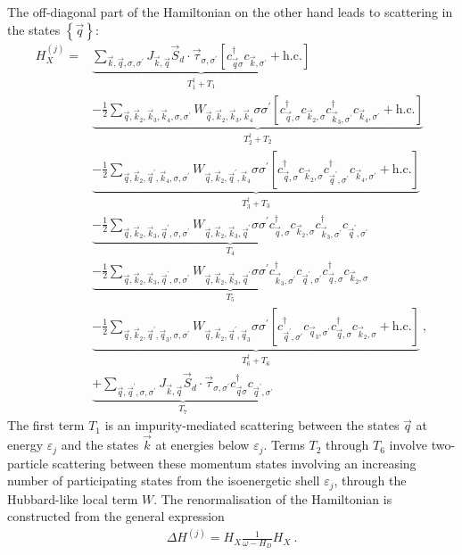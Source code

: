 \documentclass{revtex4-2}
\begin{document}
The off-diagonal part of the Hamiltonian on the other hand leads to scattering in the states \(\left\{ \vec q \right\} \):
\begin{equation}\begin{aligned}
	H_X^{(j)} =& \underbrace{\sum_{\vec k, \vec q, \sigma,\sigma^\prime}J_{\vec k, \vec q} \vec{S}_d\cdot\vec{\tau}_{\sigma,\sigma^\prime}\left[c^\dagger_{\vec q\sigma}c_{\vec k,\sigma^\prime} + \text{h.c.}\right]}_{T_1^\dagger + T_1} \\
		   &\underbrace{- \frac{1}{2}\sum_{\vec q,\vec k_2, \vec k_3, \vec k_4,\sigma,\sigma^\prime}W_{\vec q,\vec k_2,\vec k_3,\vec k_4} \sigma\sigma^\prime \left[c^\dagger_{\vec q,\sigma}c_{\vec k_2,\sigma}c^\dagger_{\vec k_3,\sigma^\prime}c_{\vec k_4,\sigma^\prime} + \text{h.c.}\right]}_{T_2^\dagger + T_2}\\
		   &\underbrace{- \frac{1}{2}\sum_{\vec q,\vec k_2, \vec q^\prime, \vec k_4,\sigma,\sigma^\prime}W_{\vec q,\vec k_2, \vec q^\prime, \vec k_4} \sigma\sigma^\prime \left[c^\dagger_{\vec q,\sigma}c_{\vec k_2,\sigma}c^\dagger_{\vec q^\prime,\sigma^\prime}c_{\vec k_4,\sigma^\prime} + \text{h.c.}\right]}_{T_3^\dagger + T_3}\\
		   &\underbrace{- \frac{1}{2}\sum_{\vec q,\vec k_2,\vec k_3,\vec q^\prime,\sigma,\sigma^\prime}W_{\vec q,\vec k_2,\vec k_3,\vec q^\prime} \sigma\sigma^\prime c^\dagger_{\vec q,\sigma}c_{\vec k_2,\sigma}c^\dagger_{\vec k_3,\sigma^\prime}c_{\vec q^\prime,\sigma^\prime}}_{T_4}\\
		   &\underbrace{- \frac{1}{2}\sum_{\vec q,\vec k_2,\vec k_3,\vec q^\prime,\sigma,\sigma^\prime}W_{\vec q,\vec k_2,\vec k_3,\vec q^\prime} \sigma\sigma^\prime c^\dagger_{\vec k_3,\sigma^\prime}c_{\vec q^\prime,\sigma^\prime}c^\dagger_{\vec q,\sigma}c_{\vec k_2,\sigma}}_{T_5}\\
		   &\underbrace{- \frac{1}{2}\sum_{\vec q,\vec k_2, \vec q^\prime, \vec q_3,\sigma,\sigma^\prime}W_{\vec q,\vec k_2, \vec q^\prime, \vec q_3} \sigma\sigma^\prime \left[c^\dagger_{\vec q^\prime,\sigma^\prime}c_{\vec q_3,\sigma^\prime}c^\dagger_{\vec q,\sigma}c_{\vec k_2,\sigma} + \text{h.c.}\right]}_{T_6^\dagger + T_6}~,\\
		   &\underbrace{+\sum_{\vec q, \vec q^\prime, \sigma,\sigma^\prime}J_{\vec k, \vec q} \vec{S}_d\cdot\vec{\tau}_{\sigma,\sigma^\prime}c^\dagger_{\vec q\sigma}c_{\vec q^\prime,\sigma^\prime}}_{T_7}
\end{aligned}\end{equation}
The first term \(T_1\) is an impurity-mediated scattering between the states \(\vec q\) at energy \(\varepsilon_j\) and the states \(\vec k\) at energies below \(\varepsilon_j\). Terms \(T_2\) through \(T_6\) involve two-particle scattering between these momentum states involving an increasing number of participating states from the isoenergetic shell \(\varepsilon_j\), through the Hubbard-like local term \(W\). The renormalisation of the Hamiltonian is constructed from the general expression
\begin{equation}\begin{aligned}
	\Delta H^{(j)} = H_X \frac{1}{\omega- H_D} H_X~.
\end{aligned}\end{equation}
\end{document}
